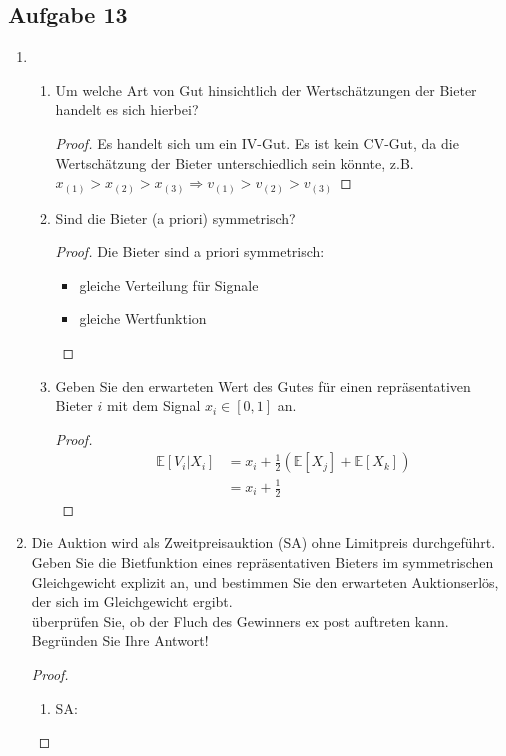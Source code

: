 \documentclass[12pt]{extreport} %
\theoremstyle{named}
\theoremstyle{nnamed}
\theoremstyle{itshape}
\theoremstyle{normal}
\begin{document}
\subsection*{Aufgabe 13}
\begin{enumerate}
	\item \begin{enumerate}
	  \item Um welche Art von Gut hinsichtlich der Wertschätzungen der Bieter handelt es sich hierbei?
		\begin{proof}
			Es handelt sich um ein IV-Gut. Es ist kein CV-Gut, da die Wertschätzung der Bieter unterschiedlich sein könnte, z.B. $x_{(1)} > x_{(2)} > x_{(3)} \Rightarrow v_{(1)} > v_{(2)} > v_{(3)}$
		\end{proof}
	  \item Sind die Bieter (a priori) symmetrisch?
		\begin{proof}
			Die Bieter sind a priori symmetrisch:
			\begin{itemize}
				\item gleiche Verteilung für Signale
				\item gleiche Wertfunktion
			\end{itemize}
		\end{proof}
	  \item Geben Sie den erwarteten Wert des Gutes für einen repräsentativen Bieter $i$ mit dem Signal $x_{i} \in [0, 1]$ an.
		\begin{proof}
			\begin{align*}
				\mathds{E} \left[ V_{i} \big| X_{i} \right] & = x_{i} + \frac{1}{2} \left( \mathds{E} \left[ X_{j} \right] + \mathds{E} \left[ X_{k} \right] \right) \\
			& = x_{i} + \frac{1}{2}
			\end{align*}
		\end{proof}
	 \end{enumerate}
	\item Die Auktion wird als Zweitpreisauktion (SA) ohne Limitpreis durchgeführt. ~\\
		Geben Sie die Bietfunktion eines repräsentativen Bieters im symmetrischen Gleichgewicht explizit an, und bestimmen Sie den erwarteten Auktionserlös, der sich im Gleichgewicht ergibt. ~\\
		überprüfen Sie, ob der Fluch des Gewinners ex post auftreten kann. Begründen Sie Ihre Antwort!
		\begin{proof}
			\begin{enumerate}
				\item SA: 

\end{enumerate}
\end{proof}
\end{enumerate}
\end{document}
